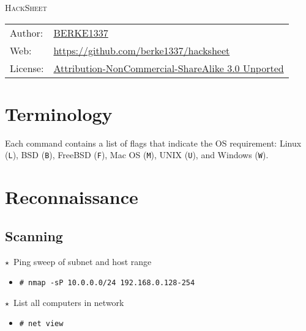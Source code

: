 \documentclass[10pt,landscape]{article}
\newcommand{\os}[1]{\texttt{\footnotesize{#1}}}
\newcommand{\freebsd}{\os{F}}
\newcommand{\bsd}{\os{B}}
\newcommand{\unix}{\os{U}}
\newcommand{\linux}{\os{L}}
\newcommand{\macos}{\os{M}}
\newcommand{\windows}{\os{W}}
\newenvironment{action}[1]
  {\begin{minipage}[c]{\linewidth}$\star$~#1\begin{itemize}[leftmargin=1cm]}
  {\end{itemize}\end{minipage}\vspace*{3pt}}
\newcommand{\cmd}[2]{\item[#1] {\small\tt\# #2}}
\begin{document}
\begin{multicols*}{3}

{\Huge\scshape
HackSheet\hspace{-2pt}\hspace{-4pt}
}


{\scriptsize
{}
\begin{tabular}{l l}
Author: & \href{https://github.com/berke1337}{BERKE1337}\\
Web: & \url{https://github.com/berke1337/hacksheet}\\
License: & \href{http://creativecommons.org/licenses/by-nc-sa/3.0/}
                {Attribution-NonCommercial-ShareAlike 3.0 Unported}
\end{tabular}
}


\vspace{-10pt}

\section*{Terminology}

Each command contains a list of flags that indicate the OS requirement: Linux
(\linux), BSD (\bsd), FreeBSD (\freebsd), Mac OS (\macos), UNIX (\unix), and
Windows (\windows).

\section*{Reconnaissance}

\subsection*{Scanning}

\begin{action}{Ping sweep of subnet and host range}
\cmd{\unix}{nmap -sP 10.0.0.0/24 192.168.0.128-254}
\end{action}

\begin{action}{List all computers in network}
\cmd{\windows}{net view}
\end{action}


\end{multicols*}
\end{document}
